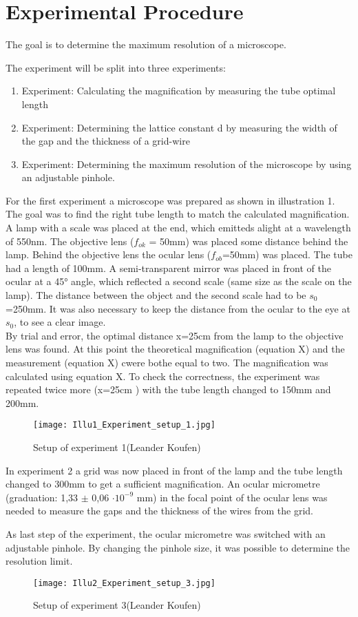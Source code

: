 \section{Experimental Procedure}

The goal is to determine the maximum resolution of a microscope.

The experiment will be split into three experiments:

\begin{enumerate}
	\item{Experiment: Calculating the magnification by measuring the tube optimal length}
	\item{Experiment: Determining the lattice constant d by measuring the width of the gap and the thickness of a grid-wire}
	\item{Experiment: Determining the maximum resolution of the microscope by using an adjustable pinhole.}
\end{enumerate}

For the first experiment a microscope was prepared as shown in illustration 1.  The goal was to find the right tube length to match the calculated magnification. A lamp with a scale was placed at the end, which emitteds alight at a wavelength of 550nm. The objective lens ($f_{ok}$ = 50mm) was placed some distance behind the lamp. Behind the objective lens the ocular lens ($f_{ob}$=50mm) was placed. The tube had a length of 100mm. A semi-transparent mirror was placed in front of the ocular at a 45° angle, which reflected a second scale (same size as the scale on the lamp). The distance between the object and the second scale had to be $s_{0}$=250mm. It was also necessary to keep the distance from the ocular to the eye at $s_{0}$, to see a clear image.
\\
By trial and error, the optimal distance x=25cm from the lamp to the objective lens was found. At this point the theoretical magnification (equation X) and the measurement (equation X) cwere bothe equal to two. The magnification was calculated using equation X. To check the correctness, the experiment was repeated twice more (x=25cm ) with the tube length changed to 150mm and 200mm.

\begin{figure}[h!]
    \centering
  \texttt{[image: Illu1\_Experiment\_setup\_1.jpg]}
  \caption{Setup of experiment 1(Leander Koufen)}
\end{figure}

In experiment 2 a grid was now placed in front of the lamp and the tube length changed to 300mm to get a sufficient magnification. An ocular micrometre (graduation: 1,33 $\pm$ 0,06 $\cdot10^{-9}$ mm) in the focal point of the ocular lens was needed to measure the gaps and the thickness of the wires from the grid.

As last step of the experiment, the ocular micrometre was switched with an adjustable pinhole. By changing the pinhole size, it was possible to determine the resolution limit.

\begin{figure}[h!]
    \centering
  \texttt{[image: Illu2\_Experiment\_setup\_3.jpg]}
  \caption{Setup of experiment 3(Leander Koufen)}
\end{figure}

\newpage

